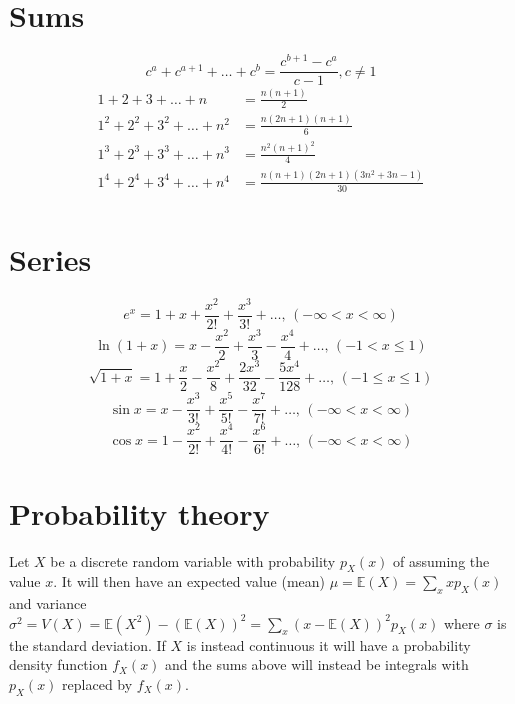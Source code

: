 

\section{Sums}
\[ c^a + c^{a+1} + \dots + c^{b} = \frac{c^{b+1} - c^a}{c-1}, c \neq 1 \]
\begin{align*}
	1 + 2 + 3 + \dots + n &= \frac{n(n+1)}{2} \\
	1^2 + 2^2 + 3^2 + \dots + n^2 &= \frac{n(2n+1)(n+1)}{6} \\
	1^3 + 2^3 + 3^3 + \dots + n^3 &= \frac{n^2(n+1)^2}{4} \\
	1^4 + 2^4 + 3^4 + \dots + n^4 &= \frac{n(n+1)(2n+1)(3n^2 + 3n - 1)}{30} \\
\end{align*}

\section{Series}
$$e^x = 1+x+\frac{x^2}{2!}+\frac{x^3}{3!}+\dots,\,(-\infty<x<\infty)$$
$$\ln(1+x) = x-\frac{x^2}{2}+\frac{x^3}{3}-\frac{x^4}{4}+\dots,\,(-1<x\leq1)$$
$$\sqrt{1+x} = 1+\frac{x}{2}-\frac{x^2}{8}+\frac{2x^3}{32}-\frac{5x^4}{128}+\dots,\,(-1\leq x\leq1)$$
$$\sin x = x-\frac{x^3}{3!}+\frac{x^5}{5!}-\frac{x^7}{7!}+\dots,\,(-\infty<x<\infty)$$
$$\cos x = 1-\frac{x^2}{2!}+\frac{x^4}{4!}-\frac{x^6}{6!}+\dots,\,(-\infty<x<\infty)$$

\section{Probability theory}
Let $X$ be a discrete random variable with probability $p_X(x)$ of assuming the value $x$. It will then have an expected value (mean) $\mu=\mathbb{E}(X)=\sum_xxp_X(x)$ and variance $\sigma^2=V(X)=\mathbb{E}(X^2)-(\mathbb{E}(X))^2=\sum_x(x-\mathbb{E}(X))^2p_X(x)$ where $\sigma$ is the standard deviation. If $X$ is instead continuous it will have a probability density function $f_X(x)$ and the sums above will instead be integrals with $p_X(x)$ replaced by $f_X(x)$.

